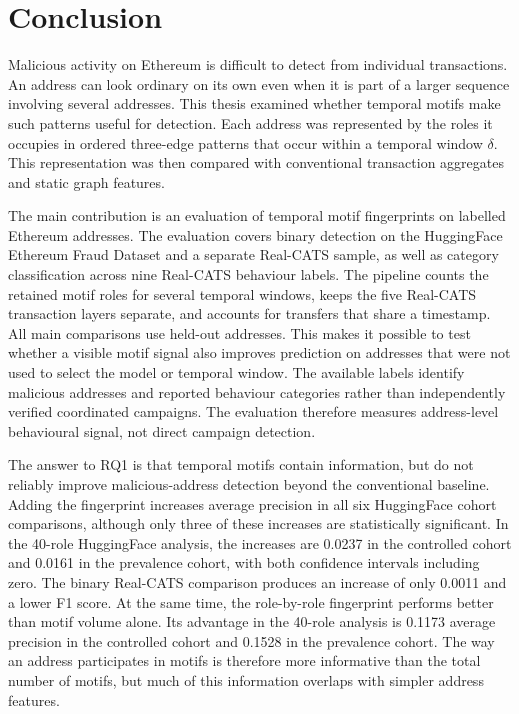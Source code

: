 \section{Conclusion}

Malicious activity on Ethereum is difficult to detect from individual
transactions. An address can look ordinary on its own even when it is part of a
larger sequence involving several addresses. This thesis examined whether
temporal motifs make such patterns useful for detection. Each address was
represented by the roles it occupies in ordered three-edge patterns that occur
within a temporal window $\delta$. This representation was then compared with
conventional transaction aggregates and static graph features.

The main contribution is an evaluation of temporal motif fingerprints
on labelled Ethereum addresses. The evaluation covers binary detection on the
HuggingFace Ethereum Fraud Dataset and a separate Real-CATS sample, as well as
category classification across nine Real-CATS behaviour labels. The pipeline
counts the retained motif roles for several temporal windows, keeps the five
Real-CATS transaction layers separate, and accounts for transfers that share a
timestamp. All main comparisons use held-out addresses. This makes it possible
to test whether a visible motif signal also improves prediction on addresses
that were not used to select the model or temporal window.
The available labels identify malicious addresses and reported behaviour
categories rather than independently verified coordinated campaigns. The
evaluation therefore measures address-level behavioural signal, not direct
campaign detection.

The answer to RQ1 is that temporal motifs contain information, but do not
reliably improve malicious-address detection beyond the conventional baseline.
Adding the fingerprint increases average precision in all six HuggingFace
cohort comparisons, although only three of these increases are statistically
significant. In the 40-role HuggingFace analysis, the increases are 0.0237 in
the controlled cohort and 0.0161 in the prevalence cohort, with both confidence
intervals including zero. The binary Real-CATS comparison produces an increase
of only 0.0011 and a lower F1 score. At the same time, the role-by-role
fingerprint performs better than motif volume alone. Its advantage in the
40-role analysis is 0.1173 average precision in the controlled cohort and
0.1528 in the prevalence cohort. The way an address participates in motifs is
therefore more informative than the total number of motifs, but much of this
information overlaps with simpler address features.

